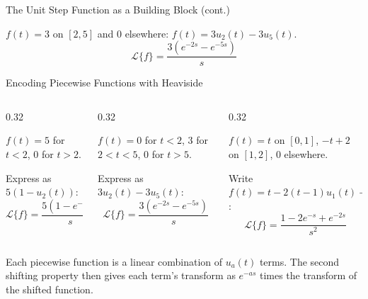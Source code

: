 \documentclass[aspectratio=169,11pt]{beamer}
\begin{document}
\begin{frame}{The Unit Step Function as a Building Block (cont.)}
\footnotesize
\begin{examplebox}
$f(t) = 3$ on $[2,5]$ and $0$ elsewhere: $f(t) = 3u_2(t) - 3u_5(t)$.
\[\mathcal{L}\{f\} = \frac{3(e^{-2s} - e^{-5s})}{s}\]
\end{examplebox}
\end{frame}

\begin{frame}{Encoding Piecewise Functions with Heaviside}
\footnotesize
\begin{columns}[T]
\begin{column}{0.32\textwidth}
\begin{examplebox}
$f(t) = 5$ for $t<2$, $0$ for $t>2$.

Express as $5(1 - u_2(t))$:
\[\mathcal{L}\{f\} = \frac{5(1-e^{-2s})}{s}\]
\end{examplebox}
\end{column}
\begin{column}{0.32\textwidth}
\begin{examplebox}
$f(t) = 0$ for $t<2$, $3$ for $2<t<5$, $0$ for $t>5$.

Express as $3u_2(t) - 3u_5(t)$:
\[\mathcal{L}\{f\} = \frac{3(e^{-2s}-e^{-5s})}{s}\]
\end{examplebox}
\end{column}
\begin{column}{0.32\textwidth}
\begin{examplebox}
$f(t) = t$ on $[0,1]$, $-t+2$ on $[1,2]$, $0$ elsewhere.

Write $f(t) = t - 2(t-1)u_1(t) + (t-2)u_2(t)$:
\[\mathcal{L}\{f\} = \frac{1 - 2e^{-s} + e^{-2s}}{s^2}\]
\end{examplebox}
\end{column}
\end{columns}
\vspace{1mm}
\begin{conceptbox}[Pattern]
Each piecewise function is a linear combination of $u_a(t)$ terms. The second shifting property then gives each term's transform as $e^{-as}$ times the transform of the shifted function.
\end{conceptbox}
\end{frame}
\end{document}
